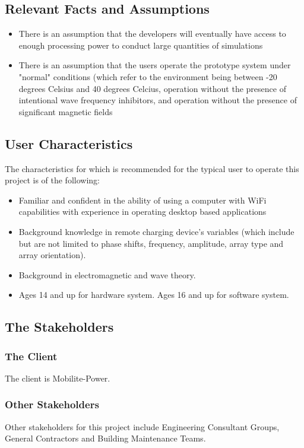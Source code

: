 \documentclass[12pt, titlepage]{article}
\begin{document}
\subsection{Relevant Facts and Assumptions}
\begin{itemize}
    \item There is an assumption that the developers will eventually have access to enough processing power to conduct large quantities of simulations
    \item There is an assumption that the users operate the prototype system under "normal" conditions (which refer to the environment being between -20 degrees Celsius and 40 degrees Celcius, operation without the presence of intentional wave frequency inhibitors, and operation without the presence of significant magnetic fields
\end{itemize}

\subsection{User Characteristics}
The characteristics for which is recommended for the typical user to operate this project is of the following:\\
\begin{itemize}
    \item Familiar and confident in the ability of using a computer with WiFi capabilities with experience in operating desktop based applications
    \item Background knowledge in remote charging device's variables (which include but are not limited to phase shifts, frequency, amplitude, array type and array orientation).
    \item Background in electromagnetic and wave theory.
    \item Ages 14 and up for hardware system. Ages 16 and up for software system.
\end{itemize}


\subsection{The Stakeholders}

\subsubsection{The Client}
The client is Mobilite-Power.
\subsubsection{Other Stakeholders}
Other stakeholders for this project include Engineering Consultant Groups, General Contractors and Building Maintenance Teams.
\end{document}
